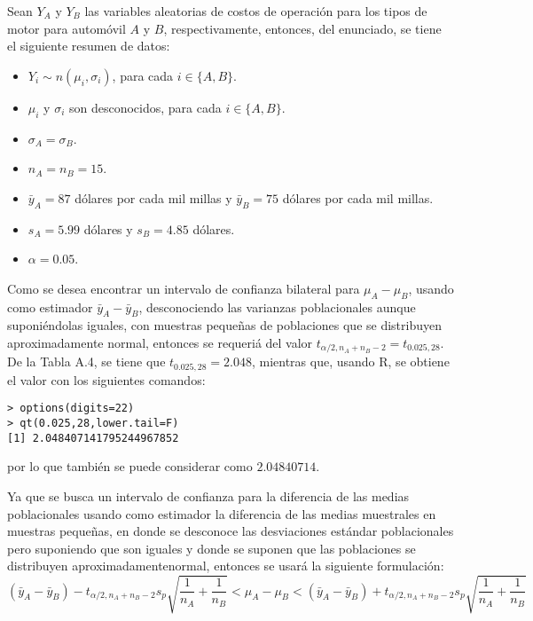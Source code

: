 \begin{solucion}
 Sean $Y_A$ y $Y_B$ las variables aleatorias de costos de operaci\'on para los tipos de motor para autom\'ovil $A$ y $B$, respectivamente, entonces, del enunciado, se tiene el siguiente resumen de datos:
 \begin{itemize}
  \item $Y_i \sim n\left( \mu_i, \sigma_i \right)$, para cada $i \in \{ A, B \}$.
  \item $\mu_i$ y $\sigma_i$ son desconocidos, para cada $i \in \{ A, B \}$.
  \item $\sigma_A = \sigma_B$.
  \item $n_A = n_B = 15$.
  \item $\bar{y}_A = 87$ d\'olares por cada mil millas y $\bar{y}_B = 75$ d\'olares por cada mil millas.
  \item $s_A = 5.99$ d\'olares y $s_B = 4.85$ d\'olares.
  \item $\alpha = 0.05$.
 \end{itemize}
 Como se desea encontrar un intervalo de confianza bilateral para $\mu_A - \mu_B$, usando como estimador $\bar{y}_A - \bar{y}_B$, desconociendo las varianzas poblacionales aunque suponi\'endolas iguales, con muestras peque\~nas de poblaciones que se distribuyen aproximadamente normal, entonces se requeri\'a del valor $t_{\alpha/2, n_A + n_B - 2} = t_{0.025,28}$. De la Tabla A.4, se tiene que $t_{0.025,28} = 2.048$, mientras que, usando R, se obtiene el valor con los siguientes comandos:
 \begin{verbatim}
> options(digits=22)
> qt(0.025,28,lower.tail=F)
[1] 2.048407141795244967852
 \end{verbatim}
 \vspace{-0.5cm}
 por lo que tambi\'en se puede considerar como $2.04840714$.
 \par Ya que se busca un intervalo de confianza para la diferencia de las medias poblacionales usando como estimador la diferencia de las medias muestrales en muestras peque\~nas, en donde se desconoce las desviaciones est\'andar poblacionales pero suponiendo que son iguales y donde se suponen que las poblaciones se distribuyen aproximadamentenormal, entonces se usar\'a la siguiente formulaci\'on:
 \begin{equation*}
  \left( \bar{y}_A - \bar{y}_B \right) - t_{\alpha/2,n_A+n_B-2}s_p\sqrt{\frac{1}{n_A} + \frac{1}{n_B}} < \mu_A - \mu_B < \left( \bar{y}_A - \bar{y}_B \right) + t_{\alpha/2,n_A+n_B-2}s_p\sqrt{\frac{1}{n_A} + \frac{1}{n_B}}
 \end{equation*}

\end{solucion}

